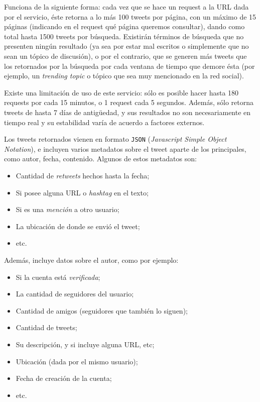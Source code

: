 \documentclass[upright, contnum]{umemoria}
\begin{document}
   Funciona de la siguiente forma: cada vez que se hace un request a la
   URL dada por el servicio, éste retorna a lo más 100 tweets por página, con un
   máximo de 15 páginas (indicando en el request qué página queremos
   consultar), dando como total hasta 1500 tweets por búsqueda. Existirán
   términos de búsqueda que no presenten ningún resultado  (ya sea por
   estar mal escritos o simplemente que no sean un tópico de discusión), o por
   el contrario, que se generen más tweets que los retornados por la
   búsqueda por cada ventana de tiempo que demore ésta (por ejemplo, un
   \emph{trending topic} o tópico que sea muy mencionado en la red social).
   
   Existe una limitación de uso de este servicio: sólo es posible hacer
   hasta 180 requests por cada 15 minutos, o 1 request cada 5
   segundos. Además, sólo retorna tweets de hasta 7 días de antigüedad, y
   sus resultados no son necesariamente en tiempo real y su estabilidad
   varía de acuerdo a factores externos.
   
   Los tweets retornados vienen en formato \texttt{JSON} (\emph{Javascript Simple Object Notation}),
   e incluyen varios metadatos sobre el tweet aparte de los principales,
   como autor, fecha, contenido. Algunos de estos metadatos son:
   
\begin{itemize}
\item Cantidad de \emph{retweets} hechos hasta la fecha;
\item Si posee alguna URL o \emph{hashtag} en el texto;
\item Si es una \emph{mención} a otro usuario;
\item La ubicación de donde se envió el tweet;
\item etc.
\end{itemize}
  Además, incluye datos sobre el autor, como por ejemplo:

\begin{itemize}
\item Si la cuenta está \emph{verificada};
\item La cantidad de seguidores del usuario;
\item Cantidad de amigos (seguidores que también lo siguen);
\item Cantidad de tweets;
\item Su descripción, y si incluye alguna URL, etc;
\item Ubicación (dada por el mismo usuario);
\item Fecha de creación de la cuenta;
\item etc.
\end{itemize}
\end{document}
